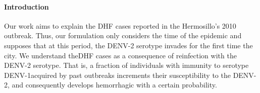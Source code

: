 \paragraph{Introduction}
    Our work aims to explain the \ac{DHF} cases reported in the Hermosillo's 
2010 outbreak. Thus, our formulation only considers the time of the epidemic and
supposes that at this period, the \ac{DENV-2} serotype invades for the first 
time the city. We understand the\ac{DHF} cases as a consequence of reinfection 
with the \ac{DENV-2} serotype. That is, a fraction of individuals with immunity 
to serotype \ac{DENV-1}\textemdash acquired by past outbreaks\textemdash 
increments their susceptibility to the \ac{DENV-2}, and consequently 
develops hemorrhagic with a certain probability.
